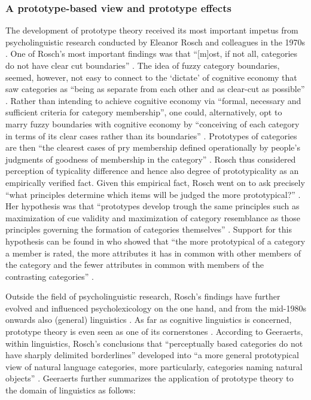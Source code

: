 \subsubsection{A prototype-based view and prototype effects}
\label{sec:2.4.3.1}  
The development of prototype theory received its most important impetus from psycholinguistic research conducted by Eleanor Rosch and colleagues in the 1970s \citep{rosch_cognitive_1975,rosch_family_1975,Rosch1978,margolis_principles_1999}. One of Rosch’s most important findings was that “[m]ost, if not all, categories do not have clear cut boundaries” \citep[196]{margolis_principles_1999}. The idea of fuzzy category boundaries, seemed, however, not easy to connect to the ‘dictate’ of cognitive economy that saw categories as “being as separate from each other and as clear-cut as possible” \citep[196]{margolis_principles_1999}. Rather than intending to achieve cognitive economy via “formal, necessary and sufficient criteria for category membership”, one could, alternatively, opt to marry fuzzy boundaries with cognitive economy by “conceiving of each category in terms of its clear cases rather than its boundaries” \citep[196]{margolis_principles_1999}. Prototypes of categories are then “the clearest cases of pry membership defined operationally by people’s judgments of goodness of membership in the category” \citep{margolis_principles_1999}. Rosch thus considered perception of typicality difference and hence also degree of prototypicality as an empirically verified fact. Given this empirical fact, Rosch went on to ask precisely “what principles determine which items will be judged the more prototypical?” \citep[197]{margolis_principles_1999}. Her hypothesis was that “prototypes develop trough the same principles such as maximization of cue validity and maximization of category resemblance as those principles governing the formation of categories themselves” \citep{margolis_principles_1999}. Support for this hypothesis can be found in \citet{rosch_family_1975} who showed that “the more prototypical of a category a member is rated, the more attributes it has in common with other members of the category and the fewer attributes in common with members of the contrasting categories” \citep[197]{margolis_principles_1999}.

Outside the field of psycholinguistic research, Rosch’s findings have further evolved and influenced psycholexicology on the one hand, and from the mid-1980s onwards also (general) linguistics \citep[578]{allan_lexical_2013}. As far as cognitive linguistics is concerned, prototype theory is even seen as one of its cornerstones \citep[145]{Geeraerts2006}. According to Geeraerts, within linguistics, Rosch’s conclusions that “perceptually based categories do not have sharply delimited borderlines” developed into “a more general prototypical view of natural language categories, more particularly, categories naming natural objects” \citep[578]{allan_lexical_2013}. Geeraerts further summarizes the application of prototype theory to the domain of linguistics as follows:

